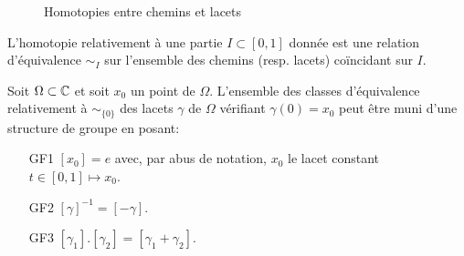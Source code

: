 \begin{figure}[h]
\begin{center}
\begin{tikzpicture}
  
\end{tikzpicture}
\shorthandon{!}\shorthandoff{:}
\end{center}
\caption{Homotopies entre chemins et lacets}
\label{fig:exemple_homotopie}
\end{figure}
L'homotopie relativement à une partie $I \subset [0,1]$ donnée est une relation d'équivalence $\sim_I$ sur l'ensemble des chemins (resp. lacets) coïncidant sur $I$.
\begin{fprop}
\label{prop:groupe_fondamental}
Soit $\Omega \subset \C$ et soit $x_0$ un point de $\Omega$. L'ensemble des classes d'équivalence relativement à $\sim_{\{0\}}$ des lacets $\gamma$ de $\Omega$ vérifiant $\gamma(0)=x_0$ peut être muni d'une structure de groupe en posant:
\begin{itemize}
\item[GF1] $[x_0]=e$ avec, par abus de notation, $x_0$ le lacet constant $t \in[0,1] \mapsto x_0.$
\item[GF2] $[\gamma]^{-1}=[-\gamma].$
\item[GF3] $[\gamma_1].[\gamma_2] = [\gamma_1 + \gamma_2].$
\end{itemize}
\end{fprop}
